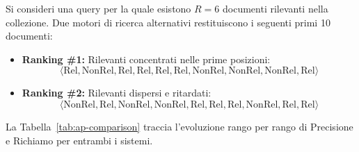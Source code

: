 \begin{example}
Si consideri una query per la quale esistono $R = 6$ documenti rilevanti nella collezione. Due motori di ricerca alternativi restituiscono i seguenti primi 10 documenti:
\begin{itemize}
    \item \textbf{Ranking \#1:} Rilevanti concentrati nelle prime posizioni:
    \[
    \langle \text{Rel}, \text{NonRel}, \text{Rel}, \text{Rel}, \text{Rel}, \text{Rel}, \text{NonRel}, \text{NonRel}, \text{NonRel}, \text{Rel} \rangle
    \]
    \item \textbf{Ranking \#2:} Rilevanti dispersi e ritardati:
    \[
    \langle \text{NonRel}, \text{Rel}, \text{NonRel}, \text{NonRel}, \text{Rel}, \text{Rel}, \text{Rel}, \text{NonRel}, \text{Rel}, \text{Rel} \rangle
    \]
\end{itemize}
La Tabella~\ref{tab:ap-comparison} traccia l'evoluzione rango per rango di Precisione e Richiamo per entrambi i sistemi.

\begin{table}[H]
\centering
{}
\caption{Calcolo comparativo dettagliato di Average Precision tra Ranking \#1 e Ranking \#2.}
\label{tab:ap-comparison}
\end{table}


\end{example}
